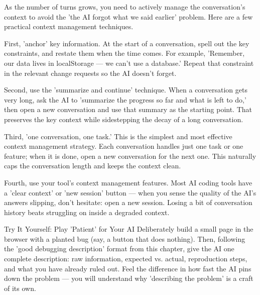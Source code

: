 
As the number of turns grows, you need to actively manage the conversation's context to avoid the 'the AI forgot what we said earlier' problem. Here are a few practical context management techniques.

First, 'anchor' key information. At the start of a conversation, spell out the key constraints, and restate them when the time comes. For example, 'Remember, our data lives in localStorage — we can't use a database.' Repeat that constraint in the relevant change requests so the AI doesn't forget.

Second, use the 'summarize and continue' technique. When a conversation gets very long, ask the AI to 'summarize the progress so far and what is left to do,' then open a new conversation and use that summary as the starting point. That preserves the key context while sidestepping the decay of a long conversation.

Third, 'one conversation, one task.' This is the simplest and most effective context management strategy. Each conversation handles just one task or one feature; when it is done, open a new conversation for the next one. This naturally caps the conversation length and keeps the context clean.

Fourth, use your tool's context management features. Most AI coding tools have a 'clear context' or 'new session' button — when you sense the quality of the AI's answers slipping, don't hesitate: open a new session. Losing a bit of conversation history beats struggling on inside a degraded context.

\begin{tcbpractice}{Try It Yourself: Play 'Patient' for Your AI}
Deliberately build a small page in the browser with a planted bug (say, a button that does nothing). Then, following the 'good debugging description' format from this chapter, give the AI one complete description: raw information, expected vs. actual, reproduction steps, and what you have already ruled out. Feel the difference in how fast the AI pins down the problem — you will understand why 'describing the problem' is a craft of its own.

\end{tcbpractice}

